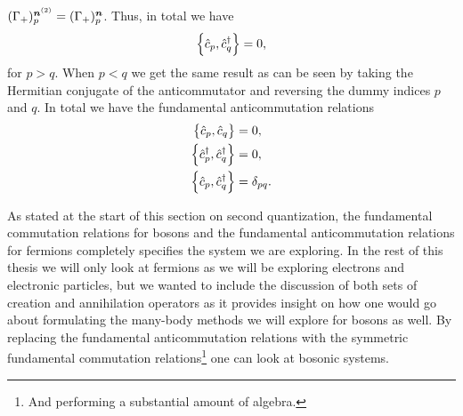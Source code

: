             $(\Gamma_{+})^{\boldsymbol{n}^{(2)}}_{p} = (\Gamma_{+})^{\boldsymbol{n}}_{p}$.
            Thus, in total we have
            \begin{align}
                \left\{\hat{c}_{p}, \hat{c}_{q}^{\dagger}\right\} = 0,
            \end{align}
            for $p > q$.
            When $p < q$ we get the same result as can be seen by taking the
            Hermitian conjugate of the anticommutator and reversing the dummy
            indices $p$ and $q$.
            In total we have the fundamental anticommutation relations
            \begin{align}
                \left\{\hat{c}_{p}, \hat{c}_{q}\right\} &= 0, \\
                \left\{\hat{c}_{p}^{\dagger}, \hat{c}_{q}^{\dagger}\right\} &= 0, \\
                \left\{\hat{c}_{p}, \hat{c}_{q}^{\dagger}\right\} &= \delta_{pq}.
            \end{align}

            As stated at the start of this section on second quantization, the
            fundamental commutation relations for bosons and the fundamental
            anticommutation relations for fermions completely specifies the
            system we are exploring.
            In the rest of this thesis we will only look at fermions as we will
            be exploring electrons and electronic particles, but we wanted to
            include the discussion of both sets of creation and annihilation
            operators as it provides insight on how one would go about
            formulating the many-body methods we will explore for bosons as
            well.
            By replacing the fundamental anticommutation relations with the
            symmetric fundamental commutation relations\footnote{%
                And performing a substantial amount of algebra.%
            } one can look at bosonic systems.


